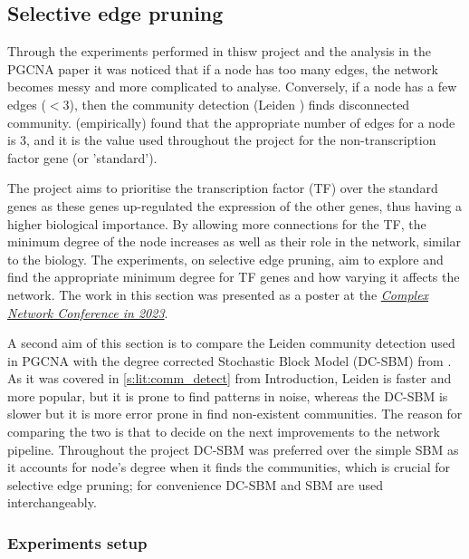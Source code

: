 \subsection{Selective edge pruning} \label{s:N_I:sel_pruning}

Through the experiments performed in thisw project and the analysis in the PGCNA paper \cite{Care2019-ij} it was noticed that if a node has too many edges, the network becomes messy and more complicated to analyse. Conversely, if a node has a few edges ($<3$), then the community detection (Leiden \citet{Traag2019-ne}) finds disconnected community. \cite{Care2019-ij} (empirically) found that the appropriate number of edges for a node is 3, and it is the value used throughout the project for the non-transcription factor gene (or 'standard'). 

The project aims to prioritise the transcription factor (TF) over the standard genes as these genes up-regulated the expression of the other genes, thus having a higher biological importance. By allowing more connections for the TF, the minimum degree of the node increases as well as their role in the network, similar to the biology. The experiments, on selective edge pruning, aim to explore and find the appropriate minimum degree for TF genes and how varying it affects the network. The work in this section was presented as a poster at the \textit{\href{https://2023.complexnetworks.org/}{Complex Network Conference in 2023}}.

A second aim of this section is to compare the Leiden \citet{Traag2019-ne} community detection used in PGCNA with the degree corrected Stochastic Block Model (DC-SBM) from \cite{Karrer2011-si, Peixoto2017-gc}. As it was covered in \cref{s:lit:comm_detect} from Introduction, Leiden is faster and more popular, but it is prone to find patterns in noise, whereas the DC-SBM is slower but it is more error prone in find non-existent communities. The reason for comparing the two is that to decide on the next improvements to the network pipeline. Throughout the project DC-SBM was preferred over the simple SBM \cite{Holland1983-eu} as it accounts for node's degree when it finds the communities, which is crucial for selective edge pruning; for convenience DC-SBM and SBM are used interchangeably.

\subsubsection{Experiments setup}


